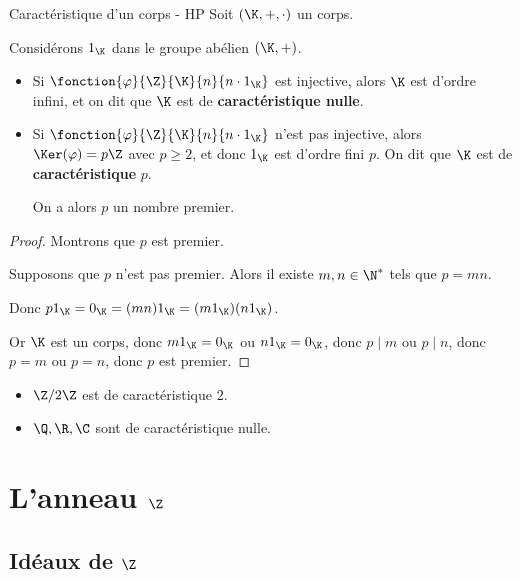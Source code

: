 \begin{definition}{Caractéristique d'un corps - HP}{}
    Soit $(\K, +, \cdot)$ un corps.

    Considérons $1_{\K}$ dans le groupe abélien $(\K, +)$.

    \begin{itemize}
        \item Si $\fonction{\varphi}{\Z}{\K}{n}{n \cdot 1_{\K}}$ est injective, alors 
        $\K$ est d'ordre infini, et on dit que $\K$ est de \textbf{caractéristique nulle}.

        \item Si $\fonction{\varphi}{\Z}{\K}{n}{n \cdot 1_{\K}}$ n'est pas injective, alors 
        $\Ker(\varphi) = p \Z$ avec $p \geqslant 2$, et donc $1_{\K}$ est d'ordre fini $p$. 
        On dit que $\K$ est de \textbf{caractéristique} $p$. 

        On a alors $p$ un nombre premier.
    \end{itemize}
\end{definition}


\begin{proof}
    Montrons que $p$ est premier. 

    Supposons que $p$ n'est pas premier. Alors il existe $m, n \in \N^*$ tels que 
    $p = mn$. 

    Donc $p1_{\K} = 0_{\K} = (mn)1_{\K} = (m1_{\K})(n1_{\K})$.

    Or $\K$ est un corps, donc $m1_{\K} = 0_{\K}$ ou $n1_{\K} = 0_{\K}$, 
    donc $p \mid m$ ou $p \mid n$, donc $p = m$ ou $p = n$, donc $p$ est premier.
\end{proof}

\begin{exemple}
    \begin{itemize}
        \item $\Z / 2 \Z$ est de caractéristique $2$.
        \item $\Q,\R,\C$ sont de caractéristique nulle.
    \end{itemize}
\end{exemple}

\section{L'anneau \texorpdfstring{$\Z$}{Z}}
\subsection{Idéaux de \texorpdfstring{$\Z$}{Z}}

